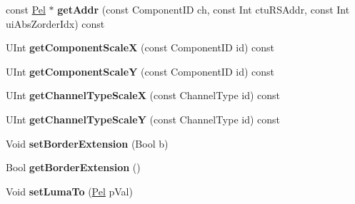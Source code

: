 \begin{DoxyCompactItemize}
const \hyperlink{_type_def_8h_af92141699657699b4b547be0c8517541}{Pel} $\ast$ {\bfseries get\+Addr} (const Component\+ID ch, const Int ctu\+R\+S\+Addr, const Int ui\+Abs\+Zorder\+Idx) const
\item 
\mbox{\label{class_t_com_pic_yuv_a0cc8878845860c0011d0ad7eed3879c6}} 
U\+Int {\bfseries get\+Component\+ScaleX} (const Component\+ID id) const
\item 
\mbox{\label{class_t_com_pic_yuv_a7495b3a12eb4e6130c6234374a4bdafc}} 
U\+Int {\bfseries get\+Component\+ScaleY} (const Component\+ID id) const
\item 
\mbox{\label{class_t_com_pic_yuv_a439581c2c4dfb7605ae75cdc08124ea8}} 
U\+Int {\bfseries get\+Channel\+Type\+ScaleX} (const Channel\+Type id) const
\item 
\mbox{\label{class_t_com_pic_yuv_a1fc964b74972c0c11baa8e29f7a39e87}} 
U\+Int {\bfseries get\+Channel\+Type\+ScaleY} (const Channel\+Type id) const
\item 
\mbox{\label{class_t_com_pic_yuv_add51fe3ae93ad8c11d2bb01f42620722}} 
Void {\bfseries set\+Border\+Extension} (Bool b)
\item 
\mbox{\label{class_t_com_pic_yuv_a79465315a84149319a72330fdfe23b21}} 
Bool {\bfseries get\+Border\+Extension} ()
\item 
\mbox{\label{class_t_com_pic_yuv_ac23bbfb9f6796d177e30af0689b33943}} 
Void {\bfseries set\+Luma\+To} (\hyperlink{_type_def_8h_af92141699657699b4b547be0c8517541}{Pel} p\+Val)
\end{DoxyCompactItemize}
